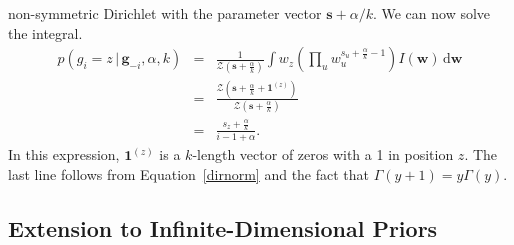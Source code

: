 \documentclass[authoryear]{elsarticle}
\newcommand{\condon}{\,|\,}
\newcommand{\vctr}[1]{\bm{#1}}
\newcommand{\dnorm}{\mathcal{Z}}
\begin{document}
non-symmetric Dirichlet with the parameter vector $\vctr{s} + \alpha/k$.
We can now solve the integral.
\begin{eqnarray}
        p({g}_i=z \condon \vctr{g}_{-i}, \alpha, k)&=&
        \frac{1}{\dnorm(\vctr{s}+\frac{\alpha}{k})}
        \int w_z \left(  \prod_u w_u^{s_u +\frac{\alpha}{k} -1} \right)
        I(\vctr{w}) \, \mathrm{d}\vctr{w}  \nonumber \\
        &=& \frac{\dnorm \left(\vctr{s}+\frac{\alpha}{k}+ \mathbf{1}^{(z)}\right) }
        {\dnorm \left(\vctr{s}+\frac{\alpha}{k}\right)} \nonumber \\
        &=& \frac{s_{z} + \frac{\alpha}{k}}{i-1+\alpha}.
\end{eqnarray}
In this expression, $\mathbf{1}^{(z)}$ is a $k$-length vector of zeros with a 1
in position $z$. The last line follows from Equation~\ref{dirnorm} and the fact
that $\Gamma(y+1)= y \Gamma(y)$.

\subsection{Extension to Infinite-Dimensional Priors}
\end{document}
